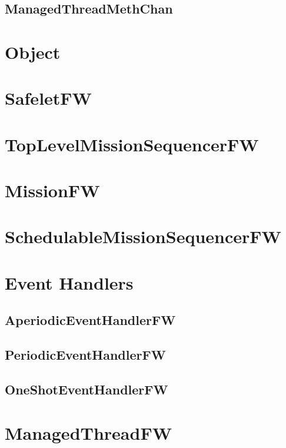 \documentclass{article}
\begin{document}
\subsection{ManagedThreadMethChan}

\newpage

\section{Object}


\section{SafeletFW}

\newpage

\section{TopLevelMissionSequencerFW}

\newpage

\section{MissionFW}

\newpage

\section{SchedulableMissionSequencerFW}

\newpage

\section{Event Handlers}
\subsection{AperiodicEventHandlerFW}

\newpage

\subsection{PeriodicEventHandlerFW}

\newpage

\subsection{OneShotEventHandlerFW}

\newpage

\section{ManagedThreadFW}

\newpage
\end{document}
